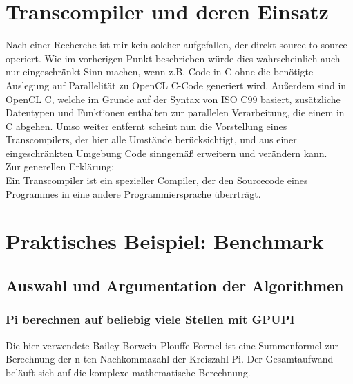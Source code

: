 \documentclass[letterpaper, 12pt]{article}
\let\tempsection\section
\renewcommand\section[1]{\vspace{-0.3cm}\tempsection{#1}\vspace{-0.3cm}}
\let\tempsubsection\subsection
\renewcommand\subsection[1]{\vspace{0cm}\tempsubsection{#1}\vspace{0cm}}
\let\tempsubsubsection\subsubsection
\renewcommand\subsubsection[1]{\vspace{0cm}\tempsubsubsection{#1}\vspace{0cm}}
\begin{document}
\newpage

\section{Transcompiler und deren Einsatz}
Nach einer Recherche ist mir kein solcher aufgefallen, der direkt source-to-source operiert. Wie im vorherigen Punkt beschrieben würde dies wahrscheinlich auch nur eingeschränkt Sinn machen, wenn z.B. Code in C ohne die benötigte Auslegung auf Parallelität zu OpenCL C-Code generiert wird. Außerdem sind in OpenCL C, welche im Grunde auf der Syntax von ISO C99 basiert, zusätzliche Datentypen und Funktionen enthalten zur parallelen Verarbeitung, die einem in C abgehen. Umso weiter entfernt scheint nun die Vorstellung eines Transcompilers, der hier alle Umstände berücksichtigt, und aus einer eingeschränkten Umgebung Code sinngemäß erweitern und verändern kann. \\
Zur generellen Erklärung: \\
Ein Transcompiler ist ein spezieller Compiler, der den Sourcecode eines Programmes in eine andere Programmiersprache überrträgt. \cite{transpiler}

\section{Praktisches Beispiel: Benchmark}
\subsection{Auswahl und Argumentation der Algorithmen}
\subsubsection{Pi berechnen auf beliebig viele Stellen mit GPUPI}
Die hier verwendete Bailey-Borwein-Plouffe-Formel ist eine Summenformel zur Berechnung der n-ten Nachkommazahl der Kreiszahl Pi. Der Gesamtaufwand beläuft sich auf die komplexe mathematische Berechnung.
\end{document}
